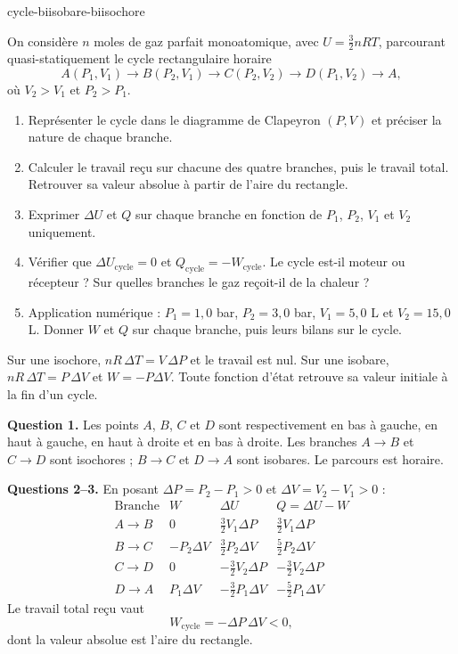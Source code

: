 \begin{exo}{cycle-biisobare-biisochore}

On considère $n$ moles de gaz parfait monoatomique, avec $U=\frac{3}{2}nRT$, parcourant quasi-statiquement le cycle rectangulaire horaire
\[
A(P_1,V_1)\to B(P_2,V_1)\to C(P_2,V_2)
\to D(P_1,V_2)\to A,
\]
où $V_2>V_1$ et $P_2>P_1$.

\begin{enumerate}
\item Représenter le cycle dans le diagramme de Clapeyron $(P,V)$ et préciser la nature de chaque branche.
\item Calculer le travail reçu sur chacune des quatre branches, puis le travail total. Retrouver sa valeur absolue à partir de l'aire du rectangle.
\item Exprimer $\Delta U$ et $Q$ sur chaque branche en fonction de $P_1$, $P_2$, $V_1$ et $V_2$ uniquement.
\item Vérifier que $\Delta U_{\mathrm{cycle}}=0$ et $Q_{\mathrm{cycle}}=-W_{\mathrm{cycle}}$. Le cycle est-il moteur ou récepteur ? Sur quelles branches le gaz reçoit-il de la chaleur ?
\item Application numérique : $P_1=1{,}0$ bar, $P_2=3{,}0$ bar, $V_1=5{,}0$ L et $V_2=15{,}0$ L. Donner $W$ et $Q$ sur chaque branche, puis leurs bilans sur le cycle.
\end{enumerate}

\begin{indication}
Sur une isochore, $nR\,\Delta T=V\,\Delta P$ et le travail est nul. Sur une isobare, $nR\,\Delta T=P\,\Delta V$ et $W=-P\Delta V$. Toute fonction d'état retrouve sa valeur initiale à la fin d'un cycle.
\end{indication}

\begin{solution}
\textbf{Question 1.} Les points $A$, $B$, $C$ et $D$ sont respectivement en bas à gauche, en haut à gauche, en haut à droite et en bas à droite. Les branches $A\to B$ et $C\to D$ sont isochores ; $B\to C$ et $D\to A$ sont isobares. Le parcours est horaire.

\textbf{Questions 2--3.} En posant $\Delta P=P_2-P_1>0$ et $\Delta V=V_2-V_1>0$ :
\[
\begin{array}{c|c|c|c}
\text{Branche} & W & \Delta U & Q=\Delta U-W\\ \hline
A\to B & 0 & \frac32V_1\Delta P & \frac32V_1\Delta P\\[2pt]
B\to C & -P_2\Delta V & \frac32P_2\Delta V & \frac52P_2\Delta V\\[2pt]
C\to D & 0 & -\frac32V_2\Delta P & -\frac32V_2\Delta P\\[2pt]
D\to A & P_1\Delta V & -\frac32P_1\Delta V & -\frac52P_1\Delta V
\end{array}
\]
Le travail total reçu vaut
\[
\boxed{W_{\mathrm{cycle}}=-\Delta P\,\Delta V<0},
\]
dont la valeur absolue est l'aire du rectangle.


\end{solution}
\end{exo}
